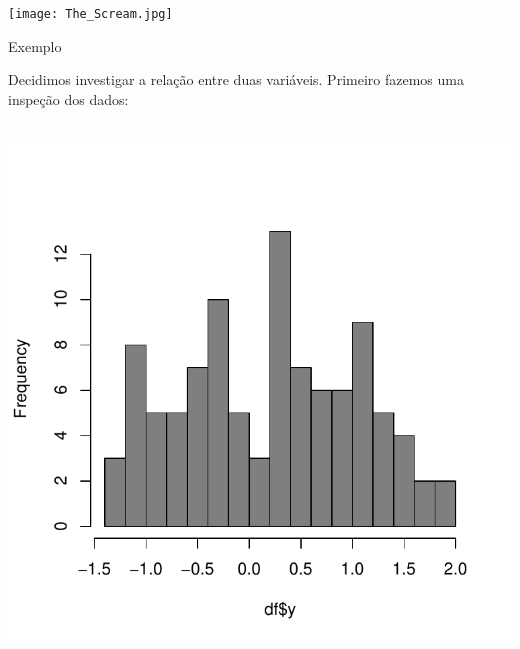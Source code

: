 \documentclass{beamer}\usepackage[]{graphicx}\usepackage[]{color}
\newenvironment{knitrout}{}{} %
\renewenvironment{knitrout}{\setlength{\topsep}{0mm}}{}
\begin{document}
\begin{frame}
\centering
\texttt{[image: The\_Scream.jpg]}

\end{frame}


\begin{frame}{Exemplo}

\begin{scriptsize}
Decidimos investigar a relação entre duas variáveis. Primeiro fazemos uma inspeção dos dados:

\end{scriptsize}

\begin{columns}[c]

\begin{knitrout}
\color{fgcolor}
\includegraphics[width=1\linewidth]{figure/histoiaf-1} 

\end{knitrout}



\end{columns}
\end{frame}
\end{document}
